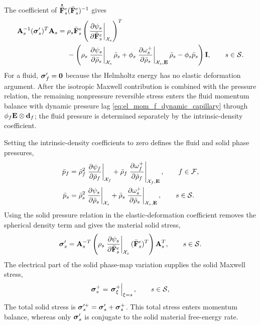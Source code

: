 The coefficient of
\(\phasedot{\bar{\mbf F}}_s^e(\bar{\mbf F}_s^e)^{-1}\) gives
%
\begin{align}
	\mathbf{A}_s^{-1}
	(\boldsymbol{\sigma}_s')^T
	\mathbf{A}_s
	={} &
	\rho_s
	\bar{\mathbf{F}}_s^e
	\left(
	\left.
	\frac{\partial \psi_s}{\partial \bar{\mathbf{F}}_s^e}
	\right\vert_{\mathcal{X}_s}
	\right)^T
	\notag  \\
	    & -
	\left(
	\rho_s
	\left.
	\frac{\partial \psi_s}{\partial \bar\rho_s}
	\right\vert_{\mathcal{X}_s}
	\bar\rho_s
	+
	\phi_s
	\left.
	\frac{\partial \omega^{+}_{s}}{\partial \bar\rho_s}
	\right\vert_{\mathcal{X}_s,\mathbf{E}}
	\bar\rho_s
	-
	\phi_s\bar p_s
	\right)\mathbf{I},
	\qquad
	s\in\mathcal{S} .
	\label{eq:MC_stress_before_pressure}
\end{align}
%
For a fluid, \(\boldsymbol{\sigma}_f'=\mathbf{0}\) because the Helmholtz energy has no elastic
deformation argument.  After the isotropic Maxwell contribution is combined
with the pressure relation, the remaining nonpressure reversible stress enters
the fluid momentum balance with dynamic pressure lag
\eqref{eq:el_mom_f_dynamic_capillary} through
\(\phi_f\mathbf{E}\otimes\mathbf{d}_f\); the fluid pressure is determined separately by
the intrinsic-density coefficient.

Setting the intrinsic-density coefficients to zero defines the fluid and solid
phase pressures,
%
\begin{subequations}
	\label{eq:MC_phase_pressure_definitions}
	\begin{align}
		\bar p_f
		 & =
		\bar\rho_f^2
		\left.
		\frac{\partial \psi_f}{\partial \bar\rho_f}
		\right\vert_{\mathcal{X}_f}
		+
		\bar\rho_f
		\left.
		\frac{\partial \omega^{+}_{f}}{\partial \bar\rho_f}
		\right\vert_{\mathcal{X}_f,\mathbf{E}},
		\qquad
		f\in\mathcal{F},
		\label{eq:MC_fluid_pressure_definition} \\
		\bar p_s
		 & =
		\bar\rho_s^2
		\left.
		\frac{\partial \psi_s}{\partial \bar\rho_s}
		\right\vert_{\mathcal{X}_s}
		+
		\bar\rho_s
		\left.
		\frac{\partial \omega^{+}_{s}}{\partial \bar\rho_s}
		\right\vert_{\mathcal{X}_s,\mathbf{E}},
		\qquad
		s\in\mathcal{S} .
		\label{eq:MC_solid_pressure_definition}
	\end{align}
\end{subequations}
%
Using the solid pressure relation in the elastic-deformation coefficient removes
the spherical density term and gives the material solid stress,
%
\begin{equation}
	\boldsymbol{\sigma}_s'
	=
	\mathbf{A}_s^{-T}
	\left(
	\rho_s
	\left.
	\frac{\partial \psi_s}{\partial \bar{\mathbf{F}}_s^e}
	\right\vert_{\mathcal{X}_s}
	(\bar{\mathbf{F}}_s^e)^T
	\right)
	\mathbf{A}_s^T,
	\qquad
	s\in\mathcal{S} .
	\label{eq:MC_solid_stress_definition}
\end{equation}
%
The electrical part of the solid phase-map variation supplies the solid Maxwell
stress,
%
\begin{equation}
	\boldsymbol{\sigma}^{+}_{s}
	=
	\left.
	\boldsymbol{\sigma}^{+}_{\xi}
	\right\vert_{\xi=s},
	\qquad
	s\in\mathcal{S} ,
	\label{eq:MC_solid_electrical_stress_contribution}
\end{equation}
%
The total solid stress is
\(\boldsymbol{\sigma}_s^{\prime+}=\boldsymbol{\sigma}_s'+\boldsymbol{\sigma}_s^+\).  This total stress enters
momentum balance, whereas only \(\boldsymbol{\sigma}_s'\) is conjugate to the solid
material free-energy rate.

